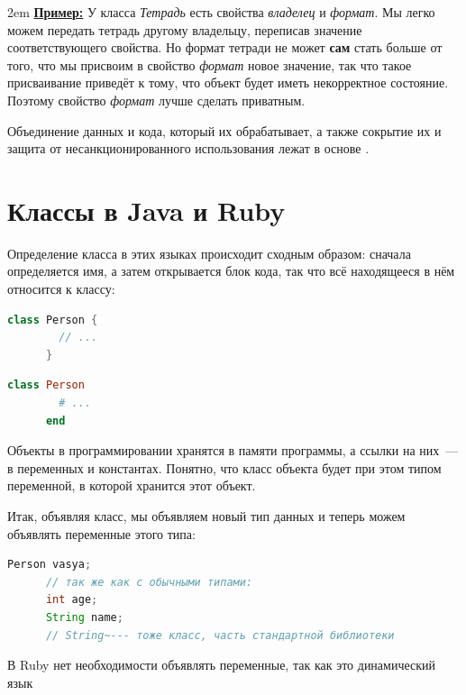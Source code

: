 \documentclass[a4paper, 14pt, titlepage]{extarticle}
\newcommand{\strong}[1]{\textbf{#1}}
\newcommand{\define}[1]{\uwave{#1}}
\newenvironment{indented}%
    { \begingroup %
        \noindent %
        \leftskip2em %
        \rightskip\leftskip }%
    { \par\endgroup }
\newenvironment{example}%
    { \begin{indented} %
        \color{dkgreen} %
        \small %
        \textbf{\underline{Пример:}} }%
    { \end{indented} }
\newenvironment{halfpage}%
    {\noindent\begin{minipage}[h]{0.49\linewidth}} %
    {\end{minipage}\hfill}
\begin{document}
  \begin{example}
    У класса \emph{Тетрадь} есть свойства \emph{владелец} и \emph{формат}. Мы легко можем передать
    тетрадь другому владельцу, переписав значение соответствующего свойства. Но формат тетради не
    может \strong{сам} стать больше от того, что мы присвоим в свойство \emph{формат} новое
    значение, так что такое присваивание приведёт к тому, что объект будет иметь некорректное
    состояние. Поэтому свойство \emph{формат} лучше сделать приватным.
  \end{example}

  Объединение данных и кода, который их обрабатывает, а также сокрытие их и защита от
  несанкционированного использования лежат в основе \define{принципа инкапсуляции}.

  \section{Классы в Java и Ruby}

  Определение класса в этих языках происходит сходным образом: сначала определяется имя, а затем
  открывается блок кода, так что всё находящееся в нём относится к классу:

  \begin{halfpage}
    \begin{lstlisting}[language=Java, title={Класс в Java}, gobble=6, texcl]
      class Person {
        // ...
      }
    \end{lstlisting}
  \end{halfpage}
  \begin{halfpage}
    \begin{lstlisting}[language=Ruby, title={Класс в Ruby}, gobble=6, texcl]
      class Person
        # ...
      end
    \end{lstlisting}
  \end{halfpage}

  Объекты в программировании хранятся в памяти программы, а ссылки на них~--- в переменных и
  константах. Понятно, что класс объекта будет при этом типом переменной, в которой хранится этот объект.

  Итак, объявляя класс, мы объявляем новый тип данных и теперь можем объявлять переменные этого типа:

  \begin{halfpage}
    \begin{lstlisting}[language=Java, title={Переменные в Java}, gobble=6, texcl]
      Person vasya;
      // так же как с обычными типами:
      int age;
      String name;
      // String~--- тоже класс, часть стандартной библиотеки
    \end{lstlisting}
  \end{halfpage}
  \begin{halfpage}
    \vskip 5mm
    В Ruby нет необходимости объявлять
    переменные, так как это динамический язык
  \end{halfpage}
\end{document}
